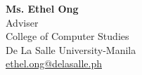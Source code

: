 %
%
%                 
\label{sec:appendixresourceperson}

%
%
%
%

%
%
\newcommand{\resperson}[4]{\textbf{#1} \\ #2 \\ #3 \\ \url{#4}\vspace{0.5em}\\}

\resperson{Ms. Ethel Ong}{Adviser}{College of Computer Studies\\De La Salle University-Manila}{ethel.ong@delasalle.ph}

